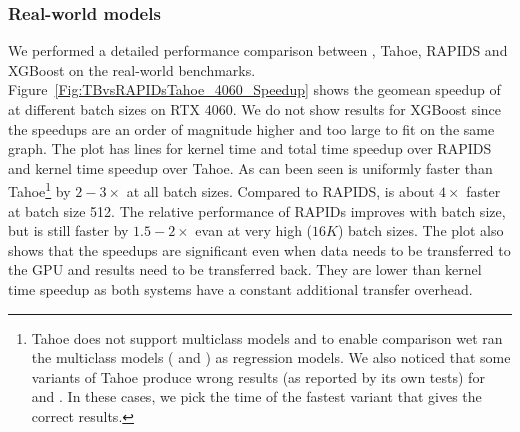 \subsubsection*{Real-world models}
We performed a detailed performance comparison between \Treebeard{}, Tahoe, RAPIDS and XGBoost on the real-world benchmarks.
Figure~\ref{Fig:TBvsRAPIDsTahoe_4060_Speedup} shows the geomean speedup of \Treebeard{} at different batch sizes on RTX 4060. 
We do not show results for XGBoost since the speedups are an order of magnitude higher and too large to fit on the same graph.  
  The plot has lines for kernel time and total time speedup over RAPIDS and kernel time speedup over Tahoe. As can been seen \Treebeard{} is uniformly faster than Tahoe{\footnote{Tahoe does not support multiclass models and to enable comparison wet ran the multiclass models ( and ) as regression models. We also noticed that some variants of Tahoe produce wrong results (as reported by its own tests) for 
   and . In these cases, we pick the time of the fastest variant that gives the correct results.
}} by $2-3\times$ at all batch sizes. 
Compared to RAPIDS, \Treebeard{} is about $4\times$ faster at batch size 512. The relative performance of RAPIDs improves with batch size, but \Treebeard{} is still faster by $1.5-2\times$ evan at very high ($16K$) batch sizes. 
The plot also shows that the speedups are significant even when data needs to be transferred to the GPU and results need to be transferred back. They are lower than kernel time speedup as both systems have a constant additional transfer overhead.

